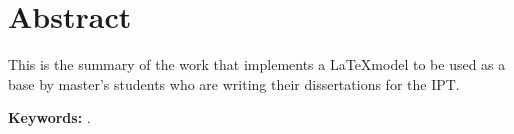 \section*{Abstract}

\bigskip

\begin{center}
    \textbf{\thstitleen}
    \thssubtitleen
\end{center}

\noindent This is the summary of the work that implements a \LaTeX model to be used as a base by master's students who are writing their dissertations for the IPT.

\bigskip

\noindent\textbf{Keywords:} \thskeywordsen.
\pagebreak
